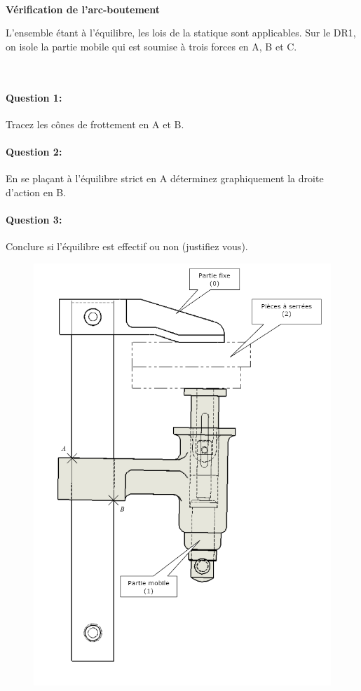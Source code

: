 ~\

\textbf{Vérification de l'arc-boutement}

L'ensemble étant à l'équilibre, les lois de la statique sont applicables. Sur le DR1, on isole la partie mobile qui est soumise à trois forces en A, B et C.  

~\

\paragraph{Question 1:} Tracez les cônes de frottement en A et B. 

\paragraph{Question 2:} En se plaçant à l'équilibre strict en A déterminez graphiquement la droite d'action en B.

\paragraph{Question 3:} Conclure si l'équilibre est effectif ou non (justifiez vous).  
 
\newpage

\begin{figure}[!h]
 \centering\includegraphics[width=0.8\linewidth]{img/serre-joint_graph.png}
\end{figure}

